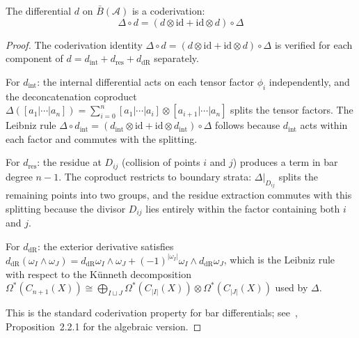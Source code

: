 \begin{theorem}\label{thm:diff-is-coderivation}
The differential $d$ on $\bar{B}(\mathcal{A})$ is a coderivation:
\[\Delta \circ d = (d \otimes \text{id} + \text{id} \otimes d) \circ \Delta\]
\end{theorem}

\begin{proof}
The coderivation identity $\Delta \circ d = (d \otimes \mathrm{id} + \mathrm{id} \otimes d) \circ \Delta$ is verified for each component of $d = d_{\mathrm{int}} + d_{\mathrm{res}} + d_{\mathrm{dR}}$ separately.

For $d_{\mathrm{int}}$: the internal differential acts on each tensor factor $\phi_i$ independently, and the deconcatenation coproduct $\Delta([a_1|\cdots|a_n]) = \sum_{i=0}^{n}[a_1|\cdots|a_i] \otimes [a_{i+1}|\cdots|a_n]$ splits the tensor factors.  The Leibniz rule $\Delta \circ d_{\mathrm{int}} = (d_{\mathrm{int}} \otimes \mathrm{id} + \mathrm{id} \otimes d_{\mathrm{int}}) \circ \Delta$ follows because $d_{\mathrm{int}}$ acts within each factor and commutes with the splitting.

For $d_{\mathrm{res}}$: the residue at $D_{ij}$ (collision of points $i$ and $j$) produces a term in bar degree $n-1$.  The coproduct restricts to boundary strata: $\Delta|_{D_{ij}}$ splits the remaining points into two groups, and the residue extraction commutes with this splitting because the divisor $D_{ij}$ lies entirely within the factor containing both $i$ and $j$.

For $d_{\mathrm{dR}}$: the exterior derivative satisfies $d_{\mathrm{dR}}(\omega_I \wedge \omega_J) = d_{\mathrm{dR}}\omega_I \wedge \omega_J + (-1)^{|\omega_I|}\omega_I \wedge d_{\mathrm{dR}}\omega_J$, which is the Leibniz rule with respect to the K\"unneth decomposition $\Omega^*(C_{n+1}(X)) \cong \bigoplus_{I \sqcup J} \Omega^*(C_{|I|}(X)) \otimes \Omega^*(C_{|J|}(X))$ used by $\Delta$.

This is the standard coderivation property for bar differentials; see~\cite{LodayVallette}, Proposition~2.2.1 for the algebraic version.
\end{proof}

